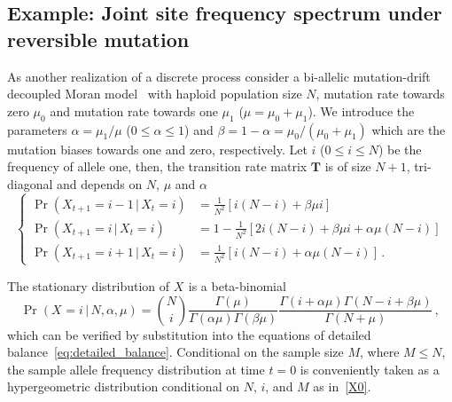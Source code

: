 \documentclass[preprint]{elsarticle}
\newcommand\given{{\,|\,}}
\newcommand\x[1]{\ensuremath{X_{#1}}}
\begin{document}
\subsection{Example: Joint site frequency spectrum under reversible mutation}\label{section:discr_rev_general}
As another realization of a discrete process consider a bi-allelic mutation-drift decoupled Moran model~\citep{Baak08,Ethe09} with haploid population size $N$, mutation rate towards zero $\mu_0$ and mutation rate towards one $\mu_1$ ($\mu=\mu_0+\mu_1$).  We introduce the parameters $\alpha=\mu_1/\mu$ ($0 \leq \alpha \leq 1$) and $\beta=1-\alpha=\mu_0/(\mu_0+\mu_1)$ which are the mutation biases towards one and zero, respectively.  Let $i$ ($0\leq i\leq N$) be the frequency of allele one, then, the transition rate matrix $\mathbf{T}$ is of size $N+1$, tri-diagonal and depends on $N$, $\mu$ and $\alpha$
\begin{equation}\label{eq:transition_decoupled_Moran}
\begin{cases}
\Pr(\x{t+1}=i-1\given \x{t}=i)&=\frac1{N^2}\left[i(N-i)+\beta\mu i\right]\\
    \Pr(\x{t+1}=i\given \x{t}=i)&=1-\frac1{N^2}\left[2i(N-i)+\beta\mu i + \alpha\mu (N-i) \right]\\
\Pr(\x{t+1}=i+1\given \x{t}=i)&=\frac1{N^2}\left[i(N-i)+\alpha\mu (N-i)\right]\,.
\end{cases}
\end{equation}

The stationary distribution of $\x{}$ is a beta-binomial
\begin{equation}\label{beta_bin}
\Pr(\x{}=i\given N,\alpha,\mu)=\binom{N}{i}
\frac{\Gamma(\mu)}{\Gamma(\alpha\mu)\Gamma(\beta\mu)}
\frac{\Gamma(i+\alpha\mu)\Gamma(N-i+\beta\mu)}{\Gamma(N+\mu)}\,,
\end{equation}
which can be verified by substitution into the equations of detailed balance~\eqref{eq:detailed_balance}. 
Conditional on the sample size $M$, where $M\leq N$, the sample allele frequency distribution at time $t=0$ is conveniently taken as a hypergeometric distribution conditional on $N$, $i$, and $M$ as in~\eqref{X0}.

\end{document}
